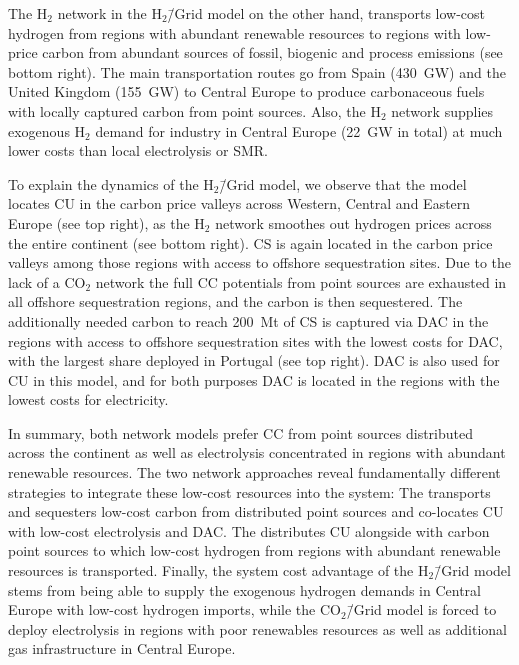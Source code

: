 \documentclass[twocolumn]{article}
\newcommand{\COtwo}{CO$_2$}
\newcommand{\Htwo}{H$_2$}
\newcommand{\modCO}{CO$_2$\=/Grid model}
\newcommand{\modH}{H$_2$\=/Grid model}
\begin{document}
The \Htwo{} network in the \modH{} on the other hand, transports low-cost hydrogen from regions with abundant renewable resources to regions with low-price carbon from abundant sources of fossil, biogenic and process emissions (see bottom right). The main transportation routes go from Spain (430~GW) and the United Kingdom (155~GW) to Central Europe to produce carbonaceous fuels with locally captured carbon from point sources. Also, the \Htwo{} network supplies exogenous \Htwo{} demand for industry in Central Europe (22~GW in total) at much lower costs than local electrolysis or SMR.

To explain the dynamics of the \modH{}, we observe that the model locates CU in the carbon price valleys across Western, Central and Eastern Europe (see top right), as the \Htwo{} network smoothes out hydrogen prices across the entire continent (see bottom right). CS is again located in the carbon price valleys among those regions with access to offshore sequestration sites. Due to the lack of a \COtwo{} network the full CC potentials from point sources are exhausted in all offshore sequestration regions, and the carbon is then sequestered. The additionally needed carbon to reach 200~Mt of CS is captured via DAC in the regions with access to offshore sequestration sites with the lowest costs for DAC, with the largest share deployed in Portugal (see top right). DAC is also used for CU in this model, and for both purposes DAC is located in the regions with the lowest costs for electricity.

In summary, both network models prefer CC from point sources distributed across the continent as well as electrolysis concentrated in regions with abundant renewable resources. The two network approaches reveal fundamentally different strategies to integrate these low-cost resources into the system: The \carbongridmodel{} transports and sequesters low-cost carbon from distributed point sources and co-locates CU with low-cost electrolysis and DAC. The \hydrogengridmodel{} distributes CU alongside with carbon point sources to which low-cost hydrogen from regions with abundant renewable resources is transported.
%
Finally, the system cost advantage of the \modH{} stems from being able to supply the exogenous hydrogen demands in Central Europe with low-cost hydrogen imports, while the \modCO{} is forced to deploy electrolysis in regions with poor renewables resources as well as additional gas infrastructure in Central Europe.
\end{document}
